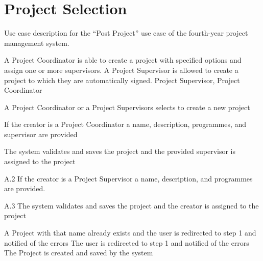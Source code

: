 \documentclass[document.tex]{subfiles}
\begin{document}
\FloatBarrier


\section {Project Selection}
\label {sec:detailed-use-cases-1-management}


\begin{table}[!htbp]
  \centering
  \caption{Use case description for the ``Post Project'' use case of the fourth-year project management system.}
  \label{tbl:use-case-create-project}

  \begin{usecase}
    A Project Coordinator is able to create a project with specified options and assign one or more supervisors. A Project Supervisor is allowed to create a project to which they are automatically signed.
    Project Supervisor, Project Coordinator
    \ucnormal
    \begin{ucenum}
      \item A Project Coordinator or a Project Supervisors selects to create a new project
      \item If the creator is a Project Coordinator a name, description, programmes, and supervisor are provided
      \item The system validates and saves the project and the provided supervisor is assigned to the project
    \end{ucenum}
    \begin{ucenum}
      \item [A.2] If the creator is a Project Supervisor a name, description, and programmes are provided.
      \item [A.3] The system validates and saves the project and the creator is assigned to the project
    \end{ucenum}
    A Project with that name already exists and the user is redirected to step 1 and notified of the errors
    The user is redirected to step 1 and notified of the errors
    The Project is created and saved by the system
  \end{usecase}
\end{table}
\end{document}
